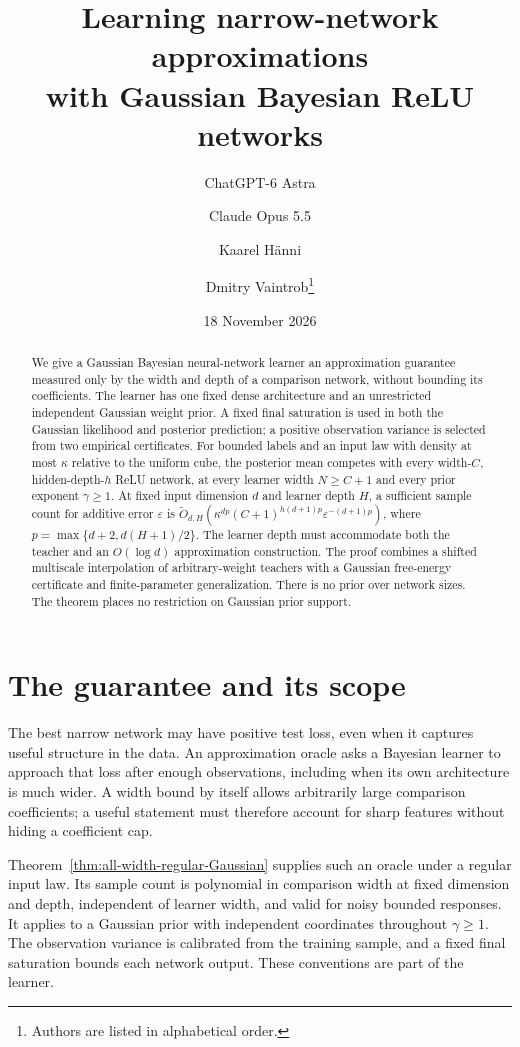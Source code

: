 \documentclass[11pt]{article}
\title{Learning narrow-network approximations\\with Gaussian Bayesian ReLU networks}
\author{ChatGPT-6 Astra \and Claude Opus 5.5 \and Kaarel H\"anni \and Dmitry Vaintrob\thanks{Authors are listed in alphabetical order.}}
\date{18 November 2026}
\begin{document}
\maketitle
\begin{abstract}
We give a Gaussian Bayesian neural-network learner an approximation guarantee measured only by the width and depth of a comparison network, without bounding its coefficients. The learner has one fixed dense architecture and an unrestricted independent Gaussian weight prior. A fixed final saturation is used in both the Gaussian likelihood and posterior prediction; a positive observation variance is selected from two empirical certificates. For bounded labels and an input law with density at most $\kappa$ relative to the uniform cube, the posterior mean competes with every width-$C$, hidden-depth-$h$ ReLU network, at every learner width $N\ge C+1$ and every prior exponent $\gamma\ge1$. At fixed input dimension $d$ and learner depth $H$, a sufficient sample count for additive error $\varepsilon$ is $\widetilde O_{d,H}(\kappa^{dp}(C+1)^{h(d+1)p}\varepsilon^{-(d+1)p})$, where $p=\max\{d+2,d(H+1)/2\}$. The learner depth must accommodate both the teacher and an $O(\log d)$ approximation construction. The proof combines a shifted multiscale interpolation of arbitrary-weight teachers with a Gaussian free-energy certificate and finite-parameter generalization. There is no prior over network sizes. The theorem places no restriction on Gaussian prior support.
\end{abstract}

\section*{The guarantee and its scope}
The best narrow network may have positive test loss, even when it captures useful structure in the data. An approximation oracle asks a Bayesian learner to approach that loss after enough observations, including when its own architecture is much wider. A width bound by itself allows arbitrarily large comparison coefficients; a useful statement must therefore account for sharp features without hiding a coefficient cap.

Theorem~\ref{thm:all-width-regular-Gaussian} supplies such an oracle under a regular input law. Its sample count is polynomial in comparison width at fixed dimension and depth, independent of learner width, and valid for noisy bounded responses. It applies to a Gaussian prior with independent coordinates throughout $\gamma\ge1$. The observation variance is calibrated from the training sample, and a fixed final saturation bounds each network output. These conventions are part of the learner.
\end{document}
